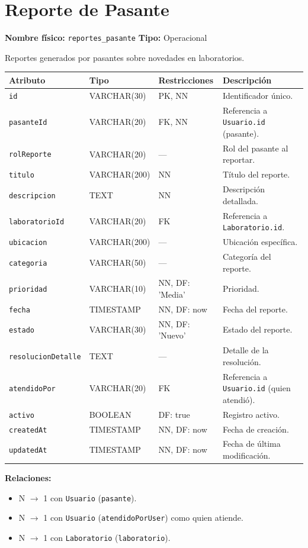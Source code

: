 \documentclass[12pt,a4paper]{article}
\newenvironment{tabladesc}[3]{%
  \section{#1}
  \textbf{Nombre físico:} \texttt{#2} \hfill \textbf{Tipo:} #3\par
  \medskip
}{%
  \bigskip
}
\begin{document}
\begin{tabladesc}{Reporte de Pasante}{reportes\_pasante}{Operacional}

Reportes generados por pasantes sobre novedades en laboratorios.

\bigskip
\begin{longtable}{L{3.5cm} L{2.5cm} L{2cm} L{7.5cm}}
\toprule
\textbf{Atributo} & \textbf{Tipo} & \textbf{Restricciones} & \textbf{Descripción} \\
\midrule
\endhead
\bottomrule
\endfoot
\texttt{id}             & VARCHAR(30)  & PK, NN & Identificador único. \\
\texttt{pasanteId}      & VARCHAR(20)  & FK, NN & Referencia a \texttt{Usuario.id} (pasante). \\
\texttt{rolReporte}     & VARCHAR(20)  & ---    & Rol del pasante al reportar. \\
\texttt{titulo}         & VARCHAR(200) & NN     & Título del reporte. \\
\texttt{descripcion}    & TEXT         & NN     & Descripción detallada. \\
\texttt{laboratorioId}  & VARCHAR(20)  & FK     & Referencia a \texttt{Laboratorio.id}. \\
\texttt{ubicacion}      & VARCHAR(200) & ---    & Ubicación específica. \\
\texttt{categoria}      & VARCHAR(50)  & ---    & Categoría del reporte. \\
\texttt{prioridad}      & VARCHAR(10)  & NN, DF: 'Media' & Prioridad. \\
\texttt{fecha}          & TIMESTAMP    & NN, DF: now & Fecha del reporte. \\
\texttt{estado}         & VARCHAR(30)  & NN, DF: 'Nuevo' & Estado del reporte. \\
\texttt{resolucionDetalle}& TEXT       & ---    & Detalle de la resolución. \\
\texttt{atendidoPor}    & VARCHAR(20)  & FK     & Referencia a \texttt{Usuario.id} (quien atendió). \\
\texttt{activo}         & BOOLEAN      & DF: true & Registro activo. \\
\texttt{createdAt}      & TIMESTAMP    & NN, DF: now & Fecha de creación. \\
\texttt{updatedAt}      & TIMESTAMP    & NN, DF: now & Fecha de última modificación. \\
\bottomrule
\end{longtable}

\textbf{Relaciones:}
\begin{itemize}[nosep]
  \item N $\rightarrow$ 1 con \texttt{Usuario} (\texttt{pasante}).
  \item N $\rightarrow$ 1 con \texttt{Usuario} (\texttt{atendidoPorUser}) como quien atiende.
  \item N $\rightarrow$ 1 con \texttt{Laboratorio} (\texttt{laboratorio}).
\end{itemize}
\end{tabladesc}
\end{document}
